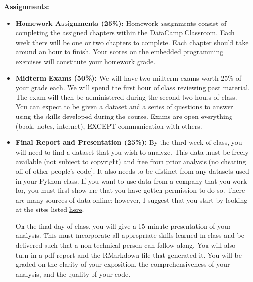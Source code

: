 \documentclass[11pt]{article}
\begin{document}
\textbf {\large Assignments:}
\begin{itemize}

			
	\item \textbf{Homework Assignments (25\%):} Homework assignments consist of completing the assigned chapters within the DataCamp Classroom. Each week there will be one or two chapters to complete. Each chapter should take around an hour to finish. Your scores on the embedded programming exercises will constitute your homework grade.
	
	\item \textbf{Midterm Exams (50\%):} We will have two midterm exams worth 25\% of your grade each. We will spend the first hour of class reviewing past material. The exam will then be administered during the second two hours of class. You can expect to be given a dataset and a series of questions to answer using the skills developed during the course. Exams are open everything (book, notes, internet), EXCEPT communication with others.

	\item \textbf{Final Report and Presentation (25\%):} By the third week of class, you will need to find a dataset that you wish to analyze. This data must be freely available (not subject to copyright) and free from prior analysis (no cheating off of other people's code). It also needs to be distinct from any datasets used in your Python class. If you want to use data from a company that you work for, you must first show me that you have gotten permission to do so. There are many sources of data online; however, I suggest that you start by looking at the sites listed \href{https://towardsdatascience.com/top-10-great-sites-with-free-data-sets-581ac8f6334}{here}.
	
	On the final day of class, you will give a 15 minute presentation of your analysis. This must incorporate all appropriate skills learned in class and be delivered such that a non-technical person can follow along. You will also turn in a pdf report and the RMarkdown file that generated it. You will be graded on the clarity of your exposition, the comprehensiveness of your analysis, and the quality of your code.
		
\end{itemize}
\end{document}
